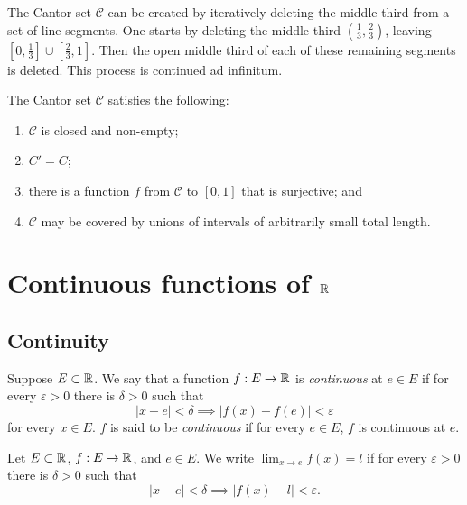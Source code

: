 \begin{definition}
	The Cantor set $\mathcal C$ can be created by iteratively
	deleting the middle third from a set of line segments.
	One starts by deleting the middle third
	$\left( \frac13, \frac23 \right)$, leaving
	$\left[ 0, \frac13 \right] \cup \left[\frac23, 1\right]$.
	Then the open middle third of each of these remaining segments is deleted.
	This process is continued ad infinitum.
\end{definition}

\begin{theorem}[]
	The Cantor set $\mathcal C$ satisfies the following:
	\begin{enumerate}
		\item $\mathcal C$ is closed and non-empty;
		\item $C' = C$;
		\item there is a function $f$ from $\mathcal C$
			to $[0,1]$ that is surjective; and
		\item $\mathcal C$ may be covered by unions of intervals of 
			arbitrarily small total length.
	\end{enumerate}
\end{theorem}

\section{Continuous functions of $\mathbb{R}$}
\subsection{Continuity}

\begin{definition}
	Suppose $E \subset \mathbb{R}$.
	We say that a function $f: E \to \mathbb{R}$ is \emph{continuous}
	at $e \in E$ if
	for every $\varepsilon > 0$ there is $\delta > 0$
	such that
	\[
		\left\lvert x - e \right\rvert < \delta
		\implies \left\lvert f(x) - f(e) \right\rvert < \varepsilon
	\]
	for every $x \in E$.
	$f$ is said to be \emph{continuous} if for every $e \in E$,
	$f$ is continuous at $e$.
\end{definition}

\begin{definition}
	Let $E \subset \mathbb{R}$, $f: E \to \mathbb{R}$, and $e \in E$.
	We write $\lim_{x \to e} f(x) = l$
	if for every $\varepsilon > 0$
	there is $\delta > 0$ such that
	\[
		\left\lvert x - e \right\rvert < \delta
		\implies \left\lvert f(x) - l \right\rvert < \varepsilon.
	\]
\end{definition}

